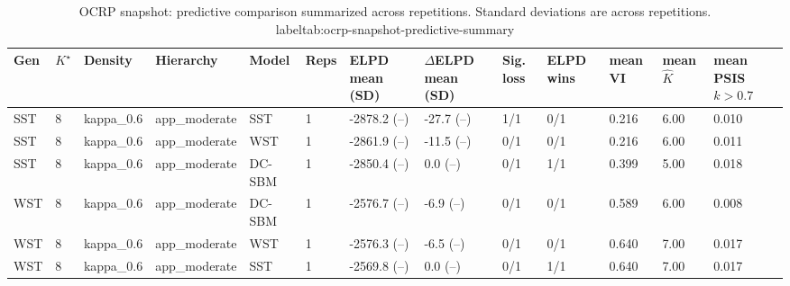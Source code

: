 \begin{table}[!h]
\centering
\caption{OCRP snapshot: predictive comparison summarized across repetitions. Standard deviations are across repetitions.\\label{tab:ocrp-snapshot-predictive-summary}}
\centering
\begin{tabular}[t]{lllllllllllll}
\toprule
Gen & $K^\star$ & Density & Hierarchy & Model & Reps & ELPD mean (SD) & $\Delta$ELPD mean (SD) & Sig. loss & ELPD wins & mean VI & mean $\hat K$ & mean PSIS $k>0.7$\\
\midrule
SST & 8 & kappa_0.6 & app_moderate & SST & 1 & -2878.2 (--) & -27.7 (--) & 1/1 & 0/1 & 0.216 & 6.00 & 0.010\\
SST & 8 & kappa_0.6 & app_moderate & WST & 1 & -2861.9 (--) & -11.5 (--) & 0/1 & 0/1 & 0.216 & 6.00 & 0.011\\
SST & 8 & kappa_0.6 & app_moderate & DC-SBM & 1 & -2850.4 (--) & 0.0 (--) & 0/1 & 1/1 & 0.399 & 5.00 & 0.018\\
WST & 8 & kappa_0.6 & app_moderate & DC-SBM & 1 & -2576.7 (--) & -6.9 (--) & 0/1 & 0/1 & 0.589 & 6.00 & 0.008\\
WST & 8 & kappa_0.6 & app_moderate & WST & 1 & -2576.3 (--) & -6.5 (--) & 0/1 & 0/1 & 0.640 & 7.00 & 0.017\\
WST & 8 & kappa_0.6 & app_moderate & SST & 1 & -2569.8 (--) & 0.0 (--) & 0/1 & 1/1 & 0.640 & 7.00 & 0.017\\
\bottomrule
\end{tabular}
\end{table}
